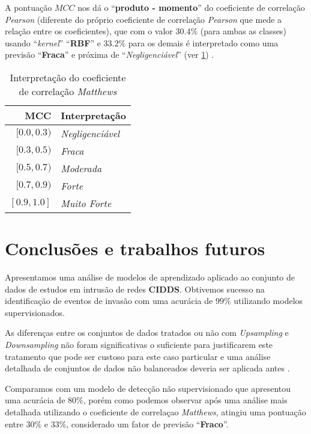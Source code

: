 \documentclass[twoside]{article}
\begin{document}
A pontuação $MCC$ nos dá o ``\textbf{produto - momento}'' do coeficiente de correlação \textit{Pearson} (diferente do próprio coeficiente de correlação \textit{Pearson} que mede a relação entre os coeficientes), que com o valor $30.4\%$ (para ambas as classes) usando ``\textit{kernel}'' ``\textbf{RBF}'' e $33.2\%$ para os demais é interpretado como uma previsão ``\textbf{Fraca}'' e próxima de ``\textit{Negligenciável}'' (ver \cref{tab:mcc}) \cite{powers2020evaluation}.

\begin{table}\scriptsize
    \centering
    \begin{tabular}{rl}
        \toprule
            MCC &  Interpretação \\
        \midrule
        $[0.0, 0.3)$ & \textit{Negligenciável} \\
        $[0.3, 0.5)$ & \textit{Fraca} \\
        $[0.5, 0.7)$ & \textit{Moderada} \\
        $[0.7, 0.9)$ & \textit{Forte} \\
        $[0.9, 1.0]$ & \textit{Muito Forte} \\
        \bottomrule
        \end{tabular}
    \caption{Interpretação do coeficiente de correlação \textit{Matthews}}
    \label{tab:mcc}
\normalsize\end{table}

\section{Conclusões e trabalhos futuros}

Apresentamos uma análise de modelos de aprendizado aplicado ao conjunto de dados de estudos em intrusão de redes \textbf{CIDDS}. Obtivemos sucesso na identificação de eventos de invasão com uma acurácia de $99\%$ utilizando modelos supervisionados. 

As diferenças entre os conjuntos de dados tratados ou não com \textit{Upsampling} e \textit{Downsampling} não foram significativas o suficiente para justificarem este tratamento que pode ser custoso para este caso particular e uma análise detalhada de conjuntos de dados não balanceados deveria ser aplicada antes \cite{barella2021assessing}.

Comparamos com um modelo de detecção não supervisionado que apresentou uma acurácia de $80\%$, porém como podemos observar após uma análise mais detalhada utilizando o coeficiente de correlaçao \textit{Matthews}, atingiu uma pontuação entre $30\%$ e $33\%$, considerado um fator de previsão ``\textbf{Fraco}''. 
\end{document}
